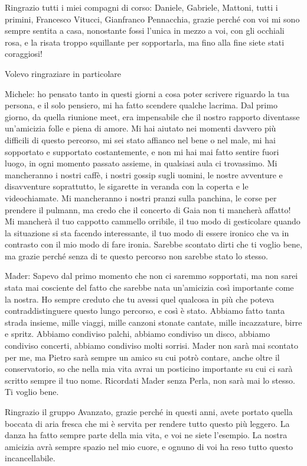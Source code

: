 Ringrazio tutti i miei compagni di corso: 
Daniele, Gabriele, Mattoni, tutti i primini, Francesco Vitucci, Gianfranco Pennacchia, grazie perché con voi mi sono sempre sentita a casa, nonostante fossi l’unica in mezzo a voi, con gli occhiali rosa, e la risata troppo squillante per sopportarla, ma fino alla fine siete stati coraggiosi! 
\@

Volevo ringraziare in particolare 
\@

Michele: ho pensato tanto in questi giorni a cosa poter scrivere riguardo la tua persona, e il solo pensiero, mi ha fatto scendere qualche lacrima. 
Dal primo giorno, da quella riunione meet, era impensabile che il nostro rapporto diventasse un’amicizia folle e piena di amore. 
Mi hai aiutato nei momenti davvero più difficili di questo percorso, mi sei stato affianco nel bene o nel male, mi hai sopportato e supportato costantemente, e non mi hai mai fatto sentire fuori luogo, in ogni momento passato assieme, in qualsiasi aula ci trovassimo. 
Mi mancheranno i nostri caffè, i nostri gossip sugli uomini, le nostre avventure e disavventure soprattutto, le sigarette in veranda con la coperta e le videochiamate. Mi mancheranno i nostri pranzi sulla panchina, le corse per prendere il pulmann, ma credo che il concerto di Gaia non ti mancherà affatto! 
Mi mancherà il tuo cappotto cammello orribile, il tuo modo di gesticolare quando la situazione si sta facendo interessante, il tuo modo di essere ironico che va in contrasto con il mio modo di fare ironia. 
Sarebbe scontato dirti che ti voglio bene, ma grazie perché senza di te questo percorso non sarebbe stato lo stesso.
\@

Mader: Sapevo dal primo momento che non ci saremmo sopportati, ma non sarei stata mai cosciente del fatto che sarebbe nata un’amicizia così importante come la nostra. 
Ho sempre creduto che tu avessi quel qualcosa in più che poteva contraddistinguere questo lungo percorso, e così è stato. 
Abbiamo fatto tanta strada insieme, mille viaggi, mille canzoni stonate cantate, mille incazzature, birre e spritz. Abbiamo condiviso palchi, abbiamo condiviso un disco, abbiamo condiviso concerti, abbiamo condiviso molti sorrisi. 
Mader non sarà mai scontato per me, ma Pietro sarà sempre un amico su cui potrò contare, anche oltre il conservatorio, so che nella mia vita avrai un posticino importante su cui ci sarà scritto sempre il tuo nome. 
Ricordati Mader senza Perla, non sarà mai lo stesso. 
Ti voglio bene. 
\@

Ringrazio il gruppo Avanzato, grazie perché in questi anni, avete portato quella boccata di aria fresca che mi è servita per rendere tutto questo più leggero. La danza ha fatto sempre parte della mia vita, e voi ne siete l’esempio. 
La nostra amicizia avrà sempre spazio nel mio cuore, e ognuno di voi ha reso tutto questo incancellabile. 
\@

